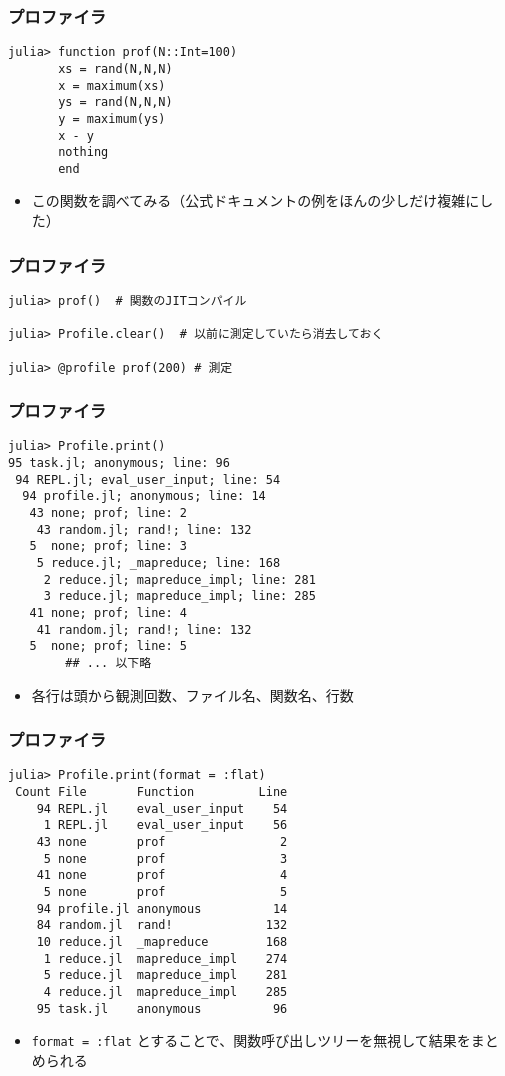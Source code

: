 \begin{frame}[containsverbatim]
\frametitle{プロファイラ}
\begin{lstlisting}
julia> function prof(N::Int=100)
       xs = rand(N,N,N)
       x = maximum(xs)
       ys = rand(N,N,N)
       y = maximum(ys)
       x - y
       nothing
       end
\end{lstlisting}
\begin{itemize}
  \item この関数を調べてみる（公式ドキュメントの例をほんの少しだけ複雑にした）
\end{itemize}
\end{frame}

\begin{frame}[containsverbatim]
\frametitle{プロファイラ}
\begin{lstlisting}
julia> prof()  # 関数のJITコンパイル

julia> Profile.clear()  # 以前に測定していたら消去しておく

julia> @profile prof(200) # 測定
\end{lstlisting}
\end{frame}

\begin{frame}[containsverbatim]
\frametitle{プロファイラ}
\begin{lstlisting}
julia> Profile.print()
95 task.jl; anonymous; line: 96
 94 REPL.jl; eval_user_input; line: 54
  94 profile.jl; anonymous; line: 14
   43 none; prof; line: 2
    43 random.jl; rand!; line: 132
   5  none; prof; line: 3
    5 reduce.jl; _mapreduce; line: 168
     2 reduce.jl; mapreduce_impl; line: 281
     3 reduce.jl; mapreduce_impl; line: 285
   41 none; prof; line: 4
    41 random.jl; rand!; line: 132
   5  none; prof; line: 5
        ## ... 以下略
 \end{lstlisting}
 \begin{itemize}
   \item 各行は頭から観測回数、ファイル名、関数名、行数
 \end{itemize}
 \end{frame}
 
 \begin{frame}[containsverbatim]
  \frametitle{プロファイラ}
  \begin{lstlisting}
julia> Profile.print(format = :flat)
 Count File       Function         Line
    94 REPL.jl    eval_user_input    54
     1 REPL.jl    eval_user_input    56
    43 none       prof                2
     5 none       prof                3
    41 none       prof                4
     5 none       prof                5
    94 profile.jl anonymous          14
    84 random.jl  rand!             132
    10 reduce.jl  _mapreduce        168
     1 reduce.jl  mapreduce_impl    274
     5 reduce.jl  mapreduce_impl    281
     4 reduce.jl  mapreduce_impl    285
    95 task.jl    anonymous          96
  \end{lstlisting}
  \begin{itemize}
    \item \verb|format = :flat| とすることで、関数呼び出しツリーを無視して結果をまとめられる
  \end{itemize}
\end{frame}

